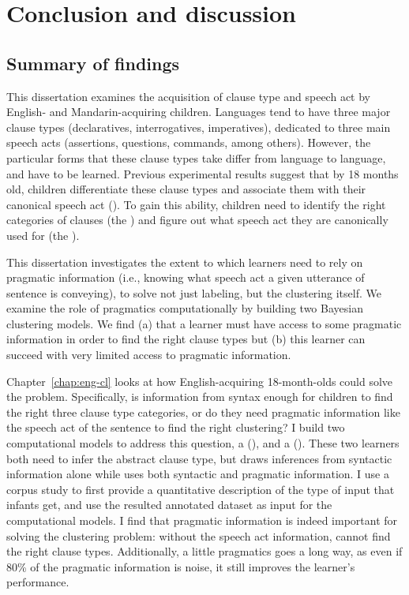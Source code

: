 \chapter{Conclusion and discussion}
\label{chap:discussion}

\section{Summary of findings}



This dissertation examines the acquisition of clause type and speech act by English- and Mandarin-acquiring children. Languages tend to have three major clause types (declaratives, interrogatives, imperatives), dedicated to three main speech acts (assertions, questions, commands, \cite{sz1985speechact} among others). However, the particular forms that these clause types take differ from language to language, and have to be learned. Previous experimental results suggest that by 18 months old, children differentiate these clause types and associate them with their canonical speech act (\cite{geffenmintz2011,geffenmintz2015wordorder,casillas2017turn,perkins2019,marshmallowqueen}). To gain this ability, children need to identify the right categories of clauses (the ) and figure out what speech act they are canonically used for (the ). 

This dissertation investigates the extent to which learners need to rely on pragmatic information (i.e., knowing what speech act a given utterance of sentence is conveying), to solve not just labeling, but the clustering itself. We examine the role of pragmatics computationally by building two Bayesian clustering models. We find (a) that a learner must have access to some pragmatic information in order to find the right clause types but (b) this learner can succeed with very limited access to pragmatic information. 

Chapter~\ref{chap:eng-cl} looks at how English-acquiring 18-month-olds could solve the problem. Specifically, is information from syntax enough for children to find the right three clause type categories, or do they need pragmatic information like the speech act of the sentence to find the right clustering? I build two computational models to address this question, a \distlearner{} (\dlearnerabbr{}), and a \praglearner{} (\plearnerabbr{}). These two learners both need to infer the abstract clause type, but \dlearnerabbr{} draws inferences from syntactic information alone while \plearnerabbr{} uses both syntactic and pragmatic information. I use a corpus study to first provide a quantitative description of the type of input that infants get, and use the resulted annotated dataset as input for the computational models. I find that pragmatic information is indeed important for solving the clustering problem: without the speech act information, \dlearnerabbr{} cannot find the right clause types. Additionally, a little pragmatics goes a long way, as  even if 80\% of the pragmatic information is noise, it still improves the learner's performance. 

